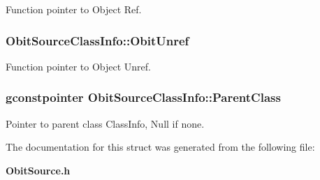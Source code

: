 Function pointer to Object Ref. 

\subsubsection{ {\bf Obit\-Source\-Class\-Info::Obit\-Unref}}\label{structObitSourceClassInfo_o11}


Function pointer to Object Unref. 

\subsubsection{\setlength{\rightskip}{0pt plus 5cm}gconstpointer {\bf Obit\-Source\-Class\-Info::Parent\-Class}}\label{structObitSourceClassInfo_o3}


Pointer to parent class Class\-Info, Null if none. 



The documentation for this struct was generated from the following file:\begin{CompactItemize}
\item 
{\bf Obit\-Source.h}\end{CompactItemize}

